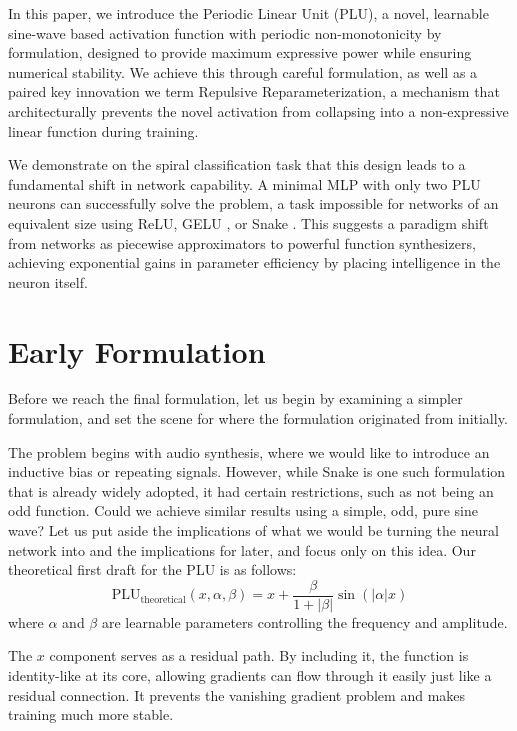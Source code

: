 \documentclass[11pt, letterpaper]{article}
\begin{document}
In this paper, we introduce the Periodic Linear Unit (PLU), a novel, learnable sine-wave based activation function with periodic non-monotonicity by formulation, designed to provide maximum expressive power while ensuring numerical stability. We achieve this through careful formulation, as well as a paired key innovation we term Repulsive Reparameterization, a mechanism that architecturally prevents the novel activation from collapsing into a non-expressive linear function during training.

We demonstrate on the spiral classification task that this design leads to a fundamental shift in network capability. A minimal MLP with only two PLU neurons can successfully solve the problem, a task impossible for networks of an equivalent size using ReLU, GELU \cite{hendrycks2016gaussianerrorlinearunits}, or Snake \cite{ziyin2020neuralnetworksfaillearn}. This suggests a paradigm shift from networks as piecewise approximators to powerful function synthesizers, achieving exponential gains in parameter efficiency by placing intelligence in the neuron itself.

\section{Early Formulation}

Before we reach the final formulation, let us begin by examining a simpler formulation, and set the scene for where the formulation originated from initially.

The problem begins with audio synthesis, where we would like to introduce an inductive bias or repeating signals. However, while Snake is one such formulation that is already widely adopted, it had certain restrictions, such as not being an odd function. Could we achieve similar results using a simple, odd, pure sine wave? Let us put aside the implications of what we would be turning the neural network into and the implications for later, and focus only on this idea. Our theoretical first draft for the PLU is as follows:
\begin{equation}
    \text{PLU}_{\text{theoretical}}(x, \alpha, \beta) = x + \frac{\beta}{1 + \lvert\beta\rvert} \sin(\lvert\alpha\rvert x)
    \label{eq:plu_theoretical}
\end{equation}
where $\alpha$ and $\beta$ are learnable parameters controlling the frequency and amplitude.

The $x$ component serves as a residual path. By including it, the function is identity-like at its core, allowing gradients can flow through it easily just like a residual connection. It prevents the vanishing gradient problem and makes training much more stable.
\end{document}
